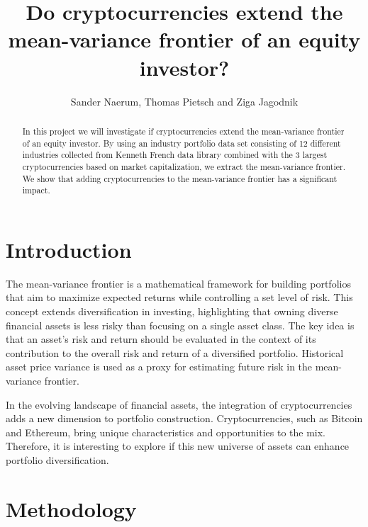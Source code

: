 \documentclass[12pt,a4paper]{article}
\title{Do cryptocurrencies extend the mean-variance frontier of an equity investor?}
\author{Sander Naerum, Thomas Pietsch and Ziga Jagodnik}
\begin{document}

\maketitle

\vspace{1cm}

\begin{abstract}
\noindent In this project we will investigate if cryptocurrencies extend the mean-variance frontier of an equity investor. 
By using an industry portfolio data set consisting of 12 different industries collected from Kenneth French data library 
combined with the 3 largest cryptocurrencies based on market capitalization, we extract the mean-variance frontier. We show 
that adding cryptocurrencies to the mean-variance frontier has a significant impact.

\end{abstract}

\clearpage
\tableofcontents
\clearpage
{}
\setcounter{page}{1}

\section{Introduction}\label{sec:intro}
The mean-variance frontier is a mathematical framework for building portfolios that aim to maximize expected returns while 
controlling a set level of risk. This concept extends diversification in investing, highlighting that owning diverse financial 
assets is less risky than focusing on a single asset class. The key idea is that an asset's risk and return should be evaluated 
in the context of its contribution to the overall risk and return of a diversified portfolio. Historical asset price variance 
is used as a proxy for estimating future risk in the mean-variance frontier.

\noindent In the evolving landscape of financial assets, the integration of cryptocurrencies adds a new dimension to portfolio 
construction. Cryptocurrencies, such as Bitcoin and Ethereum, bring unique characteristics and opportunities to the mix. 
Therefore, it is interesting to explore if this new universe of assets can enhance portfolio diversification. 

\section{Methodology}\label{sec:methods}
\end{document}
